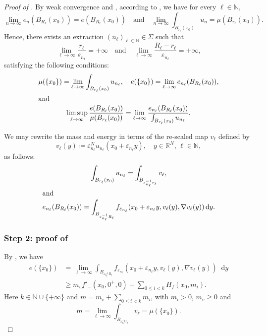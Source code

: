 \documentclass[10pt]{amsart}
\theoremstyle{plain}
\theoremstyle{definition}
\newcommand{\dd}{\mathop{}\mathopen{}\mathrm{d}}
\newcommand{\N}{\mathbb{N}}
\newcommand{\R}{\mathbb{R}}
\newcommand{\eps}{\varepsilon}
\begin{document}
\begin{proof}[Proof of ]
By weak convergence and , according to \cite[Prop.\,1.62~b)]{ambrosioFunctionsBoundedVariation2000}, we have for every \(\ell\in\N\),
\[
\lim_{n\to\infty}e_n(B_{R_\ell}(x_0))=e(B_{R_\ell}(x_0))\quad\text{and} \quad \lim_{n\to\infty}\int_{B_{r_\ell}(x_0)}u_n=\mu(B_{r_\ell}(x_0)).
\]
Hence, there exists an extraction \((n_\ell)_{\ell\in\N} \in \Sigma\) such that
\begin{equation}\label{radiiCovering}
\lim_{\ell\to\infty}\frac{r_\ell}{\eps_{n_\ell}}=+\infty \quad \text{and}\quad \lim_{\ell\to\infty}\frac{R_\ell-r_\ell}{\eps_{n_\ell}}=+\infty,
\end{equation}
satisfying the following conditions:
\begin{gather}
\label{atomsMassEnergy}
\mu(\{x_0\})=\lim_{\ell\to\infty}\int_{B_{r_\ell}(x_0)}u_{n_\ell},
\quad
e(\{x_0\}) = \lim_{\ell\to\infty} e_{n_\ell}(B_{R_\ell}(x_0)),
\\
\shortintertext{and}
\label{densityExtraction}
\limsup_{\ell\to\infty}\frac{e(B_{R_\ell}(x_0))}{\mu(B_{r_\ell}(x_0))}
=\lim_{\ell\to\infty}\frac{e_{n_\ell}(B_{R_\ell}(x_0))}{\int_{B_{r_\ell}(x_0)}u_{n_\ell}}.
\end{gather}

We may rewrite the mass and energy in terms of the re-scaled map \(v_\ell\) defined by
\begin{equation}
v_\ell(y)\coloneqq \eps_{n_\ell}^N u_{n_\ell}(x_0+\eps_{n_\ell} y),\quad y\in\R^N,\, \ell\in\N,
\end{equation}
as follows:
\begin{gather}\label{expressionRescaledMass}
\int_{B_{r_\ell}(x_0)}u_{n_\ell}=\int_{B_{\eps_{n_\ell}^{-1}r_{\ell}}}v_\ell,\\
\shortintertext{and}
\label{expressionRescaledEnergy}
e_{n_\ell}(B_{R_\ell}(x_0))=\int_{B_{\eps_{n_\ell}^{-1}R_{\ell}}}f_{\eps_{n_\ell}}(x_0+\eps_{n_\ell} y,v_{\ell}(y),\nabla v_{\ell}(y))\dd y.
\end{gather}

\subsubsection*{Step 2: proof of } By , we have
\begin{equation}
\label{lowerEnergyBound}\begin{aligned}
e(\{x_0\}) &= \lim_{\ell\to\infty} \int_{B_{\eps_{n_\ell}^{-1}R_{\ell}}}f_{\eps_{n_\ell}}(x_0+\eps_{n_\ell} y,v_{\ell}(y),\nabla v_{\ell}(y))\dd y\\
&\geq m_v f'_{-}(x_0,0^+,0)+\sum_{0\leq i<k} H_f(x_0,m_i).\end{aligned}
\end{equation}
Here \(k\in\N\cup\{+\infty\}\) and \(m=m_v+\sum_{0\leq i<k}m_i\), with \(m_i> 0\), \(m_v\geq 0\) and
\[
m=\lim_{\ell\to\infty} \int_{B_{\eps_{n_\ell}^{-1}r_{\ell}}}v_\ell =\mu(\{x_0\}).
\]


\end{proof}
\end{document}
